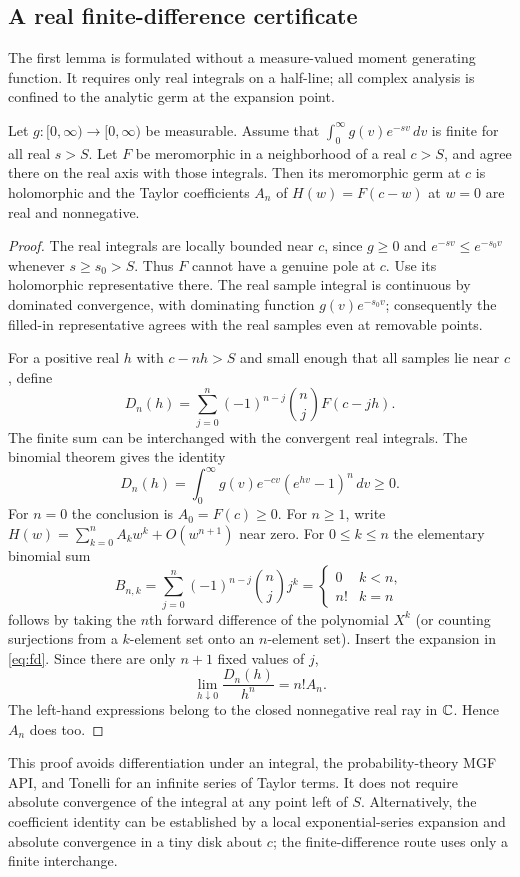 \documentclass[11pt,letterpaper]{article}
\theoremstyle{remark}\newtheorem{remark}[theorem]{Remark}
\begin{document}
\subsection{A real finite-difference certificate}
The first lemma is formulated without a measure-valued moment generating function. It requires only real integrals on a half-line; all complex analysis is confined to the analytic germ at the expansion point.
\begin{lemma}\label{lem:coeff}
Let $g:[0,\infty)\to[0,\infty)$ be measurable. Assume that $\int_0^\infty g(v)e^{-s v}\,dv$ is finite for all real $s>S$. Let $F$ be meromorphic in a neighborhood of a real $c>S$, and agree there on the real axis with those integrals. Then its meromorphic germ at $c$ is holomorphic and the Taylor coefficients $A_n$ of $H(w)=F(c-w)$ at $w=0$ are real and nonnegative.
\end{lemma}
\begin{proof}
The real integrals are locally bounded near $c$, since $g\ge0$ and $e^{-sv}\le e^{-s_0v}$ whenever $s\ge s_0>S$. Thus $F$ cannot have a genuine pole at $c$. Use its holomorphic representative there. The real sample integral is continuous by dominated convergence, with dominating function $g(v)e^{-s_0v}$; consequently the filled-in representative agrees with the real samples even at removable points.

For a positive real $h$ with $c-nh>S$ and small enough that all samples lie near $c$, define
\begin{equation}\label{eq:fd}
 D_n(h)=\sum_{j=0}^n(-1)^{n-j}\binom nj F(c-jh).
\end{equation}
The finite sum can be interchanged with the convergent real integrals. The binomial theorem gives the identity
\begin{equation}\label{eq:fdpositive}
 D_n(h)=\int_0^\infty g(v)e^{-cv}(e^{hv}-1)^n\,dv\ge0.
\end{equation}
For $n=0$ the conclusion is $A_0=F(c)\ge0$. For $n\ge1$, write $H(w)=\sum_{k=0}^n A_kw^k+O(w^{n+1})$ near zero. For $0\le k\le n$ the elementary binomial sum
\[
 B_{n,k}=\sum_{j=0}^n(-1)^{n-j}\binom nj j^k
 =\begin{cases}0&k<n,\\n!&k=n\end{cases}
\]
follows by taking the $n$th forward difference of the polynomial $X^k$ (or counting surjections from a $k$-element set onto an $n$-element set). Insert the expansion in \eqref{eq:fd}. Since there are only $n+1$ fixed values of $j$,
\[
 \lim_{h\downarrow0}\frac{D_n(h)}{h^n}=n!A_n.
\]
The left-hand expressions belong to the closed nonnegative real ray in $\mathbb C$. Hence $A_n$ does too.
\end{proof}
This proof avoids differentiation under an integral, the probability-theory MGF API, and Tonelli for an infinite series of Taylor terms. It does not require absolute convergence of the integral at any point left of $S$. Alternatively, the coefficient identity can be established by a local exponential-series expansion and absolute convergence in a tiny disk about $c$; the finite-difference route uses only a finite interchange.
\end{document}
